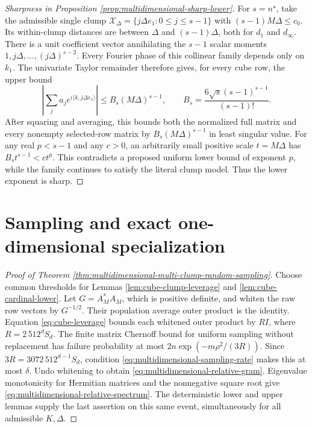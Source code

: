 \documentclass[11pt]{article}
\theoremstyle{definition}\newtheorem{definition}[theorem]{Definition}
\theoremstyle{remark}\newtheorem{remark}[theorem]{Remark}
\newcommand{\abs}[1]{\left|#1\right|}
\begin{document}
\begin{proof}[Sharpness in Proposition \ref{prop:multidimensional-sharp-lower}]
For $s=n^\star$, take the admissible single clump
$\mathcal X_\Delta=\{j\Delta e_1:0\le j\le s-1\}$ with
$(s-1)M\Delta\le c_0$. Its within-clump distances are between $\Delta$
and $(s-1)\Delta$, both for $d_1$ and $d_\infty$.
There is a unit coefficient vector annihilating the $s-1$ scalar moments
$1,j\Delta,\ldots,(j\Delta)^{s-2}$. Every Fourier phase of this collinear
family depends only on $k_1$. The univariate Taylor remainder therefore
gives, for every cube row, the upper bound
\[
 \abs{\sum_j a_j e^{i\langle k,j\Delta e_1\rangle}}
 \le B_s(M\Delta)^{s-1},\qquad
 B_s=\frac{6\sqrt{s}(s-1)^{s-1}}{(s-1)!}.
\]
After squaring and averaging, this bounds both the normalized full matrix
and every nonempty selected-row matrix by $B_s(M\Delta)^{s-1}$ in least
singular value. For any real $p<s-1$ and any $c>0$, an arbitrarily small
positive scale $t=M\Delta$ has $B_st^{s-1}<ct^p$. This contradicts a
proposed uniform lower bound of exponent $p$, while the family continues
to satisfy the literal clump model. Thus the lower exponent is sharp.
\end{proof}

\section{Sampling and exact one-dimensional specialization}
\begin{proof}[Proof of Theorem
\ref{thm:multidimensional-multi-clump-random-sampling}]
Choose common thresholds for Lemmas \ref{lem:cube-clump-leverage} and
\ref{lem:cube-cardinal-lower}. Let $G=A_M^*A_M$, which is positive definite,
and whiten the raw row vectors by $G^{-1/2}$. Their population average
outer product is the identity. Equation \eqref{eq:cube-leverage} bounds
each whitened outer product by
$R I$, where $R=2\,512^d S_d$.
The finite matrix Chernoff bound for uniform sampling without replacement
has failure probability at most $2n\exp(-m\rho^2/(3R))$.
Since $3R=3072\,512^{d-1}S_d$, condition
\eqref{eq:multidimensional-sampling-rate} makes this at most $\delta$.
Undo whitening to obtain \eqref{eq:multidimensional-relative-gram}.
Eigenvalue monotonicity for Hermitian matrices and the nonnegative square
root give \eqref{eq:multidimensional-relative-spectrum}.
The deterministic lower and upper lemmas supply the last assertion on
this same event, simultaneously for all admissible $K,\Delta$.
\end{proof}
\end{document}
